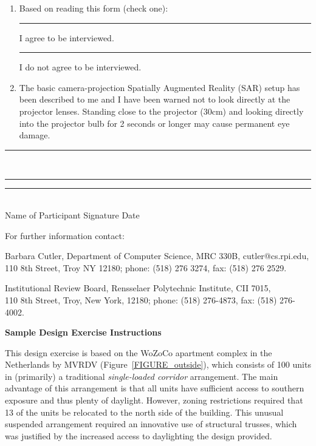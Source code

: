 \documentclass[10pt]{article}
\begin{document}
\begin{enumerate}
\item Based on reading this form (check one): 
\vspace{-0.02in}

\noindent
\hspace*{0.3in} \rule{0.3in}{1pt} I agree to be interviewed. \\
\hspace*{0.3in} \rule{0.3in}{1pt} I do not agree to be interviewed.

\vspace{-0.04in}
\item The basic camera-projection Spatially Augmented Reality (SAR)
  setup has been described to me and I have been warned not to look
  directly at the projector lenses.  Standing close to the projector
  (30cm) and looking directly into the projector bulb for 2 seconds or
  longer may cause permanent eye damage.

\end{enumerate}

\vspace{0.3in}

\noindent
\rule{2.6in}{1pt}~~~~\rule{2.6in}{1pt}\hfill \rule{1in}{1pt}\\
\hspace*{0.7in}Name of Participant 
\hfill Signature \hspace{1.3in} 
Date \hspace{0.3in}

\vspace{0.15in}
\noindent
For further information contact:

\noindent
Barbara Cutler, Department of Computer Science, MRC 330B, cutler@cs.rpi.edu,\\
110 8th Street, Troy NY 12180; phone: (518) 276 3274, fax: (518) 276 2529.

\noindent
Institutional Review Board, Rensselaer Polytechnic Institute, CII 7015, \\
110 8th Street, Troy, New York, 12180; phone: (518) 276-4873, fax: (518) 276-4002.
\vspace{-0.8in}

\newpage

\noindent
{\bf {\Large Sample Design Exercise Instructions}}

\vspace{0.1in}

\noindent
This design exercise is based on the WoZoCo apartment complex in the
Netherlands by MVRDV (Figure~\ref{FIGURE_outside}), which consists of
100 units in (primarily) a traditional {\em single-loaded corridor}
arrangement.  The main advantage of this arrangement is that all units
have sufficient access to southern exposure and thus plenty of
daylight.  However, zoning restrictions required that 13 of the units
be relocated to the north side of the building.  This unusual
suspended arrangement required an innovative use of structural
trusses, which was justified by the increased access to daylighting
the design provided.
\end{document}
